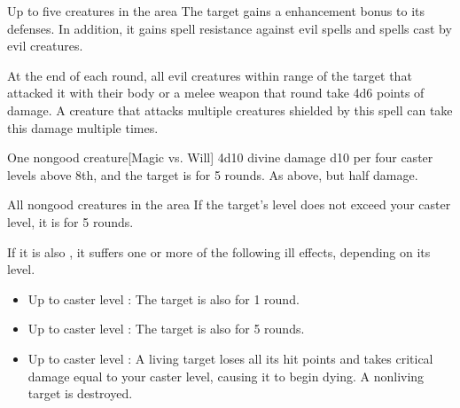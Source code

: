 \begin{spellheader}
    \spelldur{\durshort \dismissable}
\end{spellheader}
\begin{spelleffects}
    \begin{spelltargets}{Up to five creatures in the area}
        The target gains a  enhancement bonus to its defenses. In addition, it gains spell resistance against evil spells and spells cast by evil creatures.
        \par At the end of each round, all evil creatures within \rngclose range of the target that attacked it with their body or a melee weapon that round take 4d6 points of damage. A creature that attacks multiple creatures shielded by this spell can take this damage multiple times.
    \end{spelltargets}
\end{spelleffects}

\begin{spellheader}
    \spellrng{\rngmed}
\end{spellheader}
\begin{spelleffects}
    \begin{spelltarget}{One nongood creature}[Magic vs. Will]
        \spellsuccess 4d10 divine damage \add d10 per four caster levels above 8th, and the target is \bewildered for 5 rounds.
        \spellfailure As above, but half damage.
    \end{spelltarget}
\end{spelleffects}

\begin{spellheader}
\end{spellheader}
\begin{spelleffects}
    \begin{spelltargets}{All nongood creatures in the area}
        \spelleffect If the target's level does not exceed your caster level, it is \deafened for 5 rounds.

        If it is also \bloodied, it suffers one or more of the following ill effects, depending on its level.
        \begin{itemize}
            \item Up to caster level : The target is also \blinded for 1 round.
            \item Up to caster level : The target is also \paralyzed for 5 rounds.
            \item Up to caster level : A living target loses all its hit points and takes critical damage equal to your caster level, causing it to begin dying. A nonliving target is destroyed.
        \end{itemize}
    \end{spelltargets}
\end{spelleffects}

